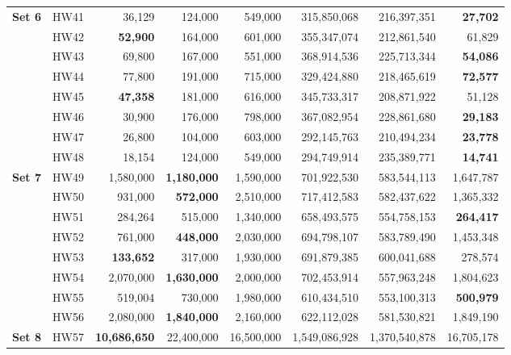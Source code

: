 \documentclass[preprint,12pt]{elsarticle}
\begin{document}
\begin{table}[htp]
{\begin{tabular}{l|r|r|r|r|r|r|r}
\multirow{8}{*}{\textbf{Set 6}} 
& HW41               & 36,129        & 124,000         & 549,000         & 315,850,068   & 216,397,351   & \textbf{27,702}       \\ 
& HW42               & \textbf{52,900}        & 164,000         & 601,000         & 355,347,074   & 212,861,540   & {61,829}       \\ 
& HW43               & 69,800        & 167,000         & 551,000         & 368,914,536   & 225,713,344   & \textbf{54,086}       \\ 
& HW44               & 77,800        & 191,000         & 715,000         & 329,424,880   & 218,465,619   & \textbf{72,577}       \\ 
& HW45               & \textbf{47,358}        & 181,000         & 616,000         & 345,733,317   & 208,871,922   & {51,128}       \\  
& HW46               & 30,900        & 176,000         & 798,000         & 367,082,954   & 228,861,680   & \textbf{29,183}       \\ 
    & HW47 & 26,800 & 104,000 & 603,000 & 292,145,763 & 210,494,234 & \textbf{23,778} \\ 
    & HW48 & 18,154 & 124,000 & 549,000 & 294,749,914 & 235,389,771 & \textbf{14,741} \\ 
    \hline 
   \multirow{8}{*}{\textbf{Set 7}} 
    & HW49 & 1,580,000 & \textbf{1,180,000} & 1,590,000 & 701,922,530 & 583,544,113 & 1,647,787 \\ 
     & HW50 & 931,000 & \textbf{572,000} & 2,510,000 & 717,412,583 & 582,437,622 & 1,365,332 \\ 
     & HW51 & {284,264} & 515,000 & 1,340,000 & 658,493,575 & 554,758,153 & \textbf{264,417} \\ 
    & HW52 & 761,000 & \textbf{448,000} & 2,030,000 & 694,798,107 & 583,789,490 & 1,453,348 \\ 
    & HW53 & \textbf{133,652} & 317,000 & 1,930,000 & 691,879,385 & 600,041,688 & 278,574 \\ 
     & HW54 & 2,070,000 & \textbf{1,630,000} & 2,000,000 & 702,453,914 & 557,963,248 & 1,804,623 \\ 
     & HW55 & {519,004} & 730,000 & 1,980,000 & 610,434,510 & 553,100,313 & \textbf{500,979} \\ 
     & HW56 & 2,080,000 & \textbf{1,840,000} & 2,160,000 & 622,112,028 & 581,530,821 & 1,849,190 \\ 
    \hline 
    \multirow{8}{*}{\textbf{Set 8}} 
    & HW57 & \textbf{10,686,650} & 22,400,000 & 16,500,000 & 1,549,086,928 & 1,370,540,878 & {16,705,178} \\ 

\end{tabular}}
\end{table}
\end{document}
